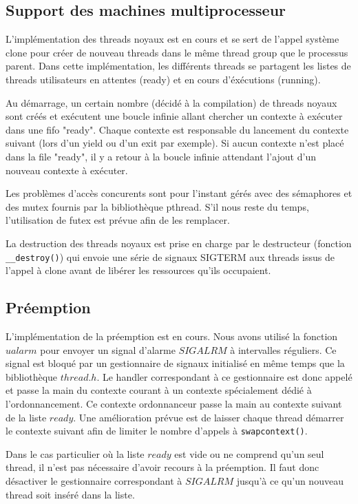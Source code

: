 \subsection{Support des machines multiprocesseur}

L'implémentation des threads noyaux est en cours et se sert de l'appel système clone pour créer de nouveau threads dans le même thread group que le processus parent. Dans cette implémentation, les différents threads se partagent les listes de threads utilisateurs en attentes (ready) et en cours d'éxécutions (running).

Au démarrage, un certain nombre (décidé à la compilation) de threads noyaux sont créés et exécutent une boucle infinie allant chercher un contexte à exécuter dans une fifo "ready". Chaque contexte est responsable du lancement du contexte suivant (lors d'un yield ou d'un exit par exemple). Si aucun contexte n'est placé dans la file "ready", il y a retour à la boucle infinie attendant l'ajout d'un nouveau contexte à exécuter.

Les problèmes d'accès concurents sont pour l'instant gérés avec des sémaphores et des mutex fournis par la bibliothèque pthread. S'il nous reste du temps, l'utilisation de futex est prévue afin de les remplacer.

La destruction des threads noyaux est prise en charge par le destructeur (fonction \verb!__destroy()!) qui envoie une série de signaux SIGTERM aux threads issus de l'appel à clone avant de libérer les ressources qu'ils occupaient.


\subsection{Préemption}
L'implémentation de la préemption est en cours. Nous avons utilisé la fonction $ualarm$ pour envoyer un signal d'alarme $SIGALRM$ à intervalles réguliers. Ce signal est bloqué par un gestionnaire de signaux initialisé en même temps que la bibliothèque $thread.h$. Le handler correspondant à ce gestionnaire est donc appelé et passe la main du contexte courant à un contexte spécialement dédié à l'ordonnancement. Ce contexte ordonnanceur passe la main au contexte suivant de la liste $ready$. Une amélioration prévue est de laisser chaque thread démarrer le contexte suivant afin de limiter le nombre d'appels à \verb!swapcontext()!.

Dans le cas particulier où la liste $ready$ est vide ou ne comprend qu'un seul thread, il n'est pas nécessaire d'avoir recours à la préemption. Il faut donc désactiver le gestionnaire correspondant à $SIGALRM$ jusqu'à ce qu'un nouveau thread soit inséré dans la liste.

